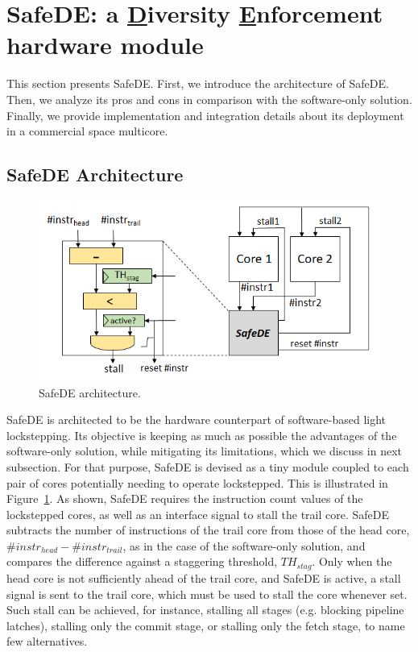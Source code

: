 \section{SafeDE: a \underline{D}iversity \underline{E}nforcement hardware module}
\label{sec:dimmo}

This section presents SafeDE. First, we introduce the architecture of SafeDE. Then, we analyze its pros and cons in comparison with the software-only solution. Finally, we provide implementation and integration details about its deployment in a commercial space multicore.

\subsection{SafeDE Architecture}

\begin{figure}[t!]
\centering
  \includegraphics[width=1\columnwidth]{imgs/dimmo.png} 
  \caption{SafeDE architecture.}
  \label{fig:dimmo}
\end{figure}

SafeDE is architected to be the hardware counterpart of software-based light lockstepping. Its objective is keeping as much as possible the advantages of the software-only solution, while mitigating its limitations, which we discuss in next subsection. For that purpose, SafeDE is devised as a tiny module coupled to each pair of cores potentially needing to operate lockstepped. This is illustrated in Figure~\ref{fig:dimmo}. As shown, SafeDE requires the instruction count values of the lockstepped cores, as well as an interface signal to stall the trail core. SafeDE subtracts the number of instructions of the trail core from those of the head core, $\#instr_{head} - \#instr_{trail}$, as in the case of the software-only solution, and compares the difference against a staggering threshold, $TH_{stag}$. Only when the head core is not sufficiently ahead of the trail core, and SafeDE is active, a stall signal is sent to the trail core, which must be used to stall the core whenever set. Such stall can be achieved, for instance, stalling all stages (e.g. blocking pipeline latches), stalling only the commit stage, or stalling only the fetch stage, to name few alternatives. 

